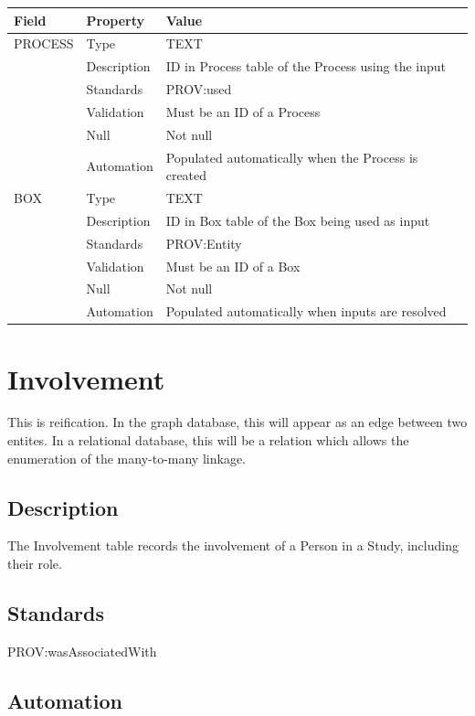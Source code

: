 \begin{longtable}[]{@{}lll@{}}
\toprule\noalign{}
Field & Property & Value \\
\midrule\noalign{}
\endhead
\bottomrule\noalign{}
\endlastfoot
PROCESS & Type & TEXT \\
& Description & ID in Process table of the Process using the input \\
& Standards & PROV:used \\
& Validation & Must be an ID of a Process \\
& Null & Not null \\
& Automation & Populated automatically when the Process is created \\
BOX & Type & TEXT \\
& Description & ID in Box table of the Box being used as input \\
& Standards & PROV:Entity \\
& Validation & Must be an ID of a Box \\
& Null & Not null \\
& Automation & Populated automatically when inputs are resolved \\
\end{longtable}

\section{Involvement}\label{involvement}

This is reification. In the graph database, this will appear as an edge
between two entites. In a relational database, this will be a relation
which allows the enumeration of the many-to-many linkage.

\subsection{Description}\label{description-16}

The Involvement table records the involvement of a Person in a Study,
including their role.

\subsection{Standards}\label{standards-18}

PROV:wasAssociatedWith

\subsection{Automation}\label{automation-18}

